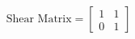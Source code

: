\documentclass[preview]{standalone}
\begin{document}
\begin{align*}
\text{Shear Matrix} = \begin{bmatrix} 1 & 1 \\ 0 & 1 \end{bmatrix}
\end{align*}
\end{document}
